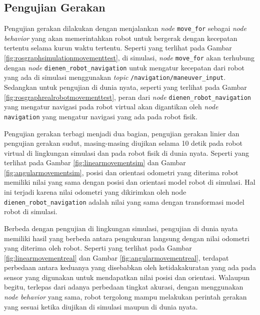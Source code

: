 \subsection{Pengujian Gerakan}
\label{subsec:movementtesting}




Pengujian gerakan dilakukan dengan menjalankan \emph{node} \lstinline{move_for} sebagai \emph{node behavior} yang akan memerintahkan robot untuk bergerak dengan kecepatan tertentu selama kurun waktu tertentu.
Seperti yang terlihat pada Gambar \ref{fig:rosgraphsimulationmovementtest},
  di simulasi,
  \emph{node} \lstinline{move_for} akan terhubung dengan \emph{node} \lstinline{dienen_robot_navigation} untuk mengatur kecepatan dari robot yang ada di simulasi menggunakan \emph{topic} \lstinline{/navigation/maneuver_input}.
Sedangkan untuk pengujian di dunia nyata, seperti yang terlihat pada Gambar \ref{fig:rosgraphrealrobotmovementtest},
  peran dari \emph{node} \lstinline{dienen_robot_navigation} yang mengatur navigasi pada robot virtual akan digantikan oleh \emph{node} \lstinline{navigation} yang mengatur navigasi yang ada pada robot fisik.




Pengujian gerakan terbagi menjadi dua bagian,
  pengujian gerakan linier dan pengujian gerakan sudut,
  masing-masing diujikan selama 10 detik pada robot virtual di lingkungan simulasi dan pada robot fisik di dunia nyata.
Seperti yang terlihat pada Gambar \ref{fig:linearmovementsim} dan Gambar \ref{fig:angularmovementsim},
  posisi dan orientasi odometri yang diterima robot memiliki nilai yang sama dengan posisi dan orientasi model robot di simulasi.
Hal ini terjadi karena nilai odometri yang dikirimkan oleh node \lstinline{dienen_robot_navigation} adalah nilai yang sama dengan transformasi model robot di simulasi.




Berbeda dengan pengujian di lingkungan simulasi,
  pengujian di dunia nyata memiliki hasil yang berbeda antara pengukuran langsung dengan nilai odometri yang diterima oleh robot.
Seperti yang terlihat pada Gambar \ref{fig:linearmovementreal} dan Gambar \ref{fig:angularmovementreal},
  terdapat perbedaan antara keduanya yang disebabkan oleh ketidakakuratan yang ada pada sensor yang digunakan untuk mendapatkan nilai posisi dan orientasi.
Walaupun begitu,
  terlepas dari adanya perbedaan tingkat akurasi, dengan menggunakan \emph{node behavior} yang sama,
  robot tergolong mampu melakukan perintah gerakan yang sesuai ketika diujikan di simulasi maupun di dunia nyata.
